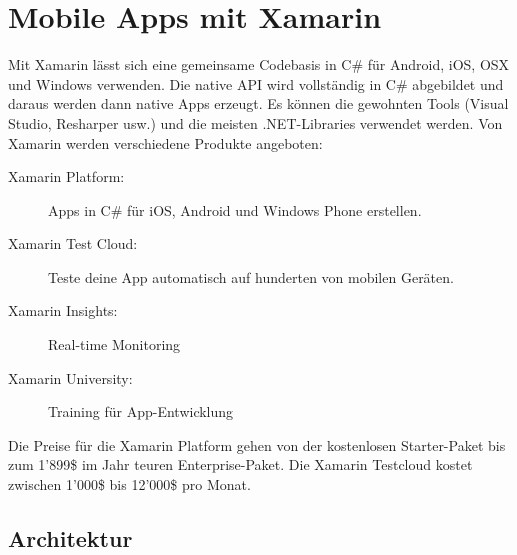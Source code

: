 \chapter{Mobile Apps mit Xamarin}

Mit Xamarin lässt sich eine gemeinsame Codebasis in C\# für Android, iOS, OSX und Windows verwenden. Die native API wird vollständig in C\# abgebildet und daraus werden dann native Apps erzeugt. Es können die gewohnten Tools (Visual Studio, Resharper usw.) und die meisten .NET-Libraries verwendet werden.
Von Xamarin werden verschiedene Produkte angeboten:
\begin{description}
	\item[Xamarin Platform:] Apps in C\# für iOS, Android und Windows Phone erstellen.
	\item[Xamarin Test Cloud:] Teste deine App automatisch auf hunderten von mobilen Geräten.
	\item[Xamarin Insights:] Real-time Monitoring
	\item[Xamarin University:] Training für App-Entwicklung
\end{description}
Die Preise für die Xamarin Platform gehen von der kostenlosen Starter-Paket bis zum 1'899\$ im Jahr teuren Enterprise-Paket. Die Xamarin Testcloud kostet zwischen 1'000\$ bis 12'000\$ pro Monat.

\section{Architektur}

